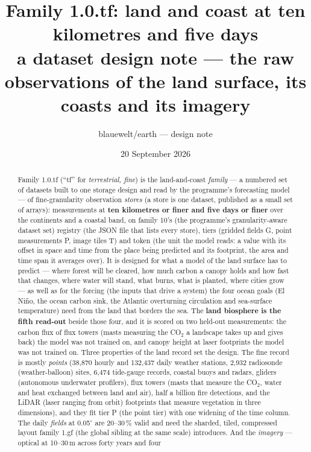 \documentclass[10pt]{article}
\title{Family 1.0.tf: land and coast at ten kilometres and five days\\
\large a dataset design note --- the raw observations of the land surface, its coasts and its imagery}
\author{blauewelt/earth --- design note}
\date{20 September 2026}
\begin{document}
\maketitle

\begin{abstract}
Family 1.0.tf (``tf'' for \emph{terrestrial, fine}) is the land-and-coast \emph{family} --- a numbered set of datasets built to one storage design and read by the programme's forecasting model --- of fine-granularity observation
\emph{stores} (a store is one dataset, published as a small set of arrays): measurements at \textbf{ten kilometres or finer and five days or
finer} over the continents and a coastal band, on family 10's (the programme's granularity-aware dataset set) registry (the JSON file that lists every store),
tiers (gridded fields G, point measurements P, image tiles T) and token (the unit the model reads: a value with its offset in space and time from the place being predicted and its footprint, the area and time span it averages over). It is designed for what a model of the land surface has to
predict --- where forest will be cleared, how much carbon a canopy holds and
how fast that changes, where water will stand, what burns, what is planted,
where cities grow --- as well as for the forcing (the inputs that drive a system) the four ocean goals (El Ni\~no, the ocean carbon sink, the Atlantic overturning circulation and sea-surface temperature) need
from the land that borders the sea. The \textbf{land biosphere is the fifth
read-out} beside those four, and it is scored on two held-out measurements:
the carbon flux of flux towers (masts measuring the CO$_2$ a landscape takes
up and gives back) the model was not trained on, and canopy height at laser
footprints the model was not trained on. Three properties of the land record set
the design. The fine record is mostly \emph{points} (38,870 hourly and
132,437 daily weather stations, 2,932 radiosonde (weather-balloon) sites, 6,474 tide-gauge
records, coastal buoys and radars, gliders (autonomous underwater profilers), flux towers (masts that measure the CO$_2$, water and heat exchanged between land and air), half a billion fire
detections, and the LiDAR (laser ranging from orbit) footprints that measure vegetation in three
dimensions), and they fit tier P (the point tier) with one widening of the time column. The
daily \emph{fields} at 0.05$^\circ$ are 20--30\,\% valid and need the
sharded, tiled, compressed layout family 1.gf (the global sibling at the same scale) introduces. And the
\emph{imagery} --- optical at 10--30\,m across forty years and four

\end{abstract}
\end{document}
